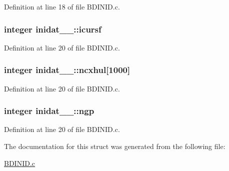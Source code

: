 Definition at line 18 of file B\+D\+I\+N\+I\+D.\+c.

\subsubsection[{\texorpdfstring{icursf}{icursf}}]{\setlength{\rightskip}{0pt plus 5cm}integer inidat\+\_\+\_\+\+::icursf}\hypertarget{structinidat__1___a652c8cd30f41629d510eccbf466ed058}{}\label{structinidat__1___a652c8cd30f41629d510eccbf466ed058}


Definition at line 20 of file B\+D\+I\+N\+I\+D.\+c.

\subsubsection[{\texorpdfstring{ncxhul}{ncxhul}}]{\setlength{\rightskip}{0pt plus 5cm}integer inidat\+\_\+\_\+\+::ncxhul\mbox{[}1000\mbox{]}}\hypertarget{structinidat__1___ad027e4a04263ae962d0762b7af80c2fc}{}\label{structinidat__1___ad027e4a04263ae962d0762b7af80c2fc}


Definition at line 20 of file B\+D\+I\+N\+I\+D.\+c.

\subsubsection[{\texorpdfstring{ngp}{ngp}}]{\setlength{\rightskip}{0pt plus 5cm}integer inidat\+\_\+\_\+\+::ngp}\hypertarget{structinidat__1___ab8eea4cdb6cc88d601cf24fa61b90d59}{}\label{structinidat__1___ab8eea4cdb6cc88d601cf24fa61b90d59}


Definition at line 20 of file B\+D\+I\+N\+I\+D.\+c.



The documentation for this struct was generated from the following file\+:\begin{DoxyCompactItemize}
\item 
\hyperlink{BDINID_8c}{B\+D\+I\+N\+I\+D.\+c}\end{DoxyCompactItemize}
